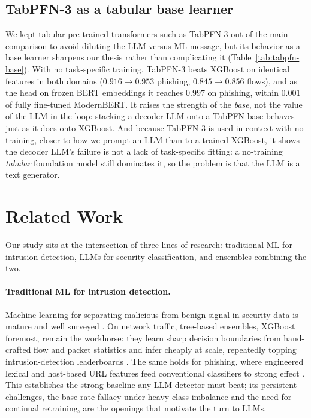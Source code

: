 \documentclass{jmlr}
\begin{document}
\subsection{TabPFN-3 as a tabular base learner}
\label{sec:tabpfn}

\noindent We kept tabular pre-trained transformers such as TabPFN-3 out of the main comparison to avoid diluting the LLM-versus-ML message, but its behavior as a base learner sharpens our thesis rather than complicating it (Table~\ref{tab:tabpfn-base}). With no task-specific training, TabPFN-3 beats XGBoost on identical features in both domains ($0.916\!\to\!0.953$ phishing, $0.845\!\to\!0.856$ flows), and as the head on frozen BERT embeddings it reaches $0.997$ on phishing, within $0.001$ of fully fine-tuned ModernBERT. It raises the strength of the \emph{base}, not the value of the LLM in the loop: stacking a decoder LLM onto a TabPFN base behaves just as it does onto XGBoost. And because TabPFN-3 is used in context with no training, closer to how we prompt an LLM than to a trained XGBoost, it shows the decoder LLM's failure is not a lack of task-specific fitting: a no-training \emph{tabular} foundation model still dominates it, so the problem is that the LLM is a text generator.


\section{Related Work}
\label{sec:related-work}

Our study sits at the intersection of three lines of research: traditional ML for intrusion
detection, LLMs for security classification, and ensembles combining the two.

\paragraph{Traditional ML for intrusion detection.}
Machine learning for separating malicious from benign signal in security data is mature and
well surveyed \citep{buczak2016survey}. On network traffic, tree-based ensembles, XGBoost
\citep{chen2016xgboost} foremost, remain the workhorse: they learn sharp decision boundaries from
hand-crafted flow and packet statistics and infer cheaply at scale, repeatedly topping
intrusion-detection leaderboards \citep{farnaaz2016randomforest}. The same holds for phishing, where
engineered lexical and host-based URL features feed conventional classifiers to strong effect
\citep{sahingoz2019phishing}. This establishes the strong baseline any LLM detector must beat; its
persistent challenges, the base-rate fallacy under heavy class imbalance and the need for continual
retraining, are the openings that motivate the turn to LLMs.
\end{document}
